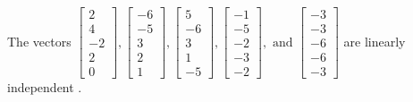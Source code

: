 \begin{exercise}
\begin{exerciseStatement}
  \end{exerciseStatement}
  \begin{exerciseAnswer}
   The vectors \(\left[\begin{array}{r}
2 \\
4 \\
-2 \\
2 \\
0
\end{array}\right] , \left[\begin{array}{r}
-6 \\
-5 \\
3 \\
2 \\
1
\end{array}\right] , \left[\begin{array}{r}
5 \\
-6 \\
3 \\
1 \\
-5
\end{array}\right] , \left[\begin{array}{r}
-1 \\
-5 \\
-2 \\
-3 \\
-2
\end{array}\right] , \text{ and } \left[\begin{array}{r}
-3 \\
-3 \\
-6 \\
-6 \\
-3
\end{array}\right]\) are 
  	 linearly independent  .
  


  \end{exerciseAnswer}
\end{exercise}